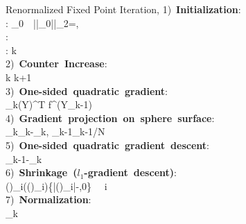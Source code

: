 \documentclass[12pt]{iopart}
\begin{document}
\begin{figure}
\begin{pseudocode}[ruled]{Renormalized Fixed Point Iteration}{\delta,\lambda}
1)\ \mbox{\bf Initialization}:\\
 \hspace{15pt}: \hspace{80pt}_{0}\ \ ||_{0}||_{2}=,\\
 \hspace{15pt}:\hspace{13pt}\delta\\
\hspace{15pt}: \hspace{62pt} k\\

2)\ \mbox{\bf Counter\ Increase}:\\
 \hspace{30pt}k \GETS k+1\\

3)\ \mbox{\bf One-sided quadratic gradient}:\\
\hspace{30pt}_{k}\GETS  (\textsc{Y}\Phi)^{\rm T} f^\prime (\textsc{Y}\Phi {}_{k-1})\\

4)\ \mbox{\bf Gradient projection on sphere surface}:\\
 \hspace{30pt}_{k}\GETS {}_{k}-\langle {}_{k},
 _{k-1}\rangle{}_{k-1}/N\\

5)\ \mbox{\bf One-sided quadratic gradient descent}:\\
 \hspace{30pt}\GETS {}_{k-1}-\delta{}_{k}\\

6)\ \mbox{\bf Shrinkage ($l_1$-gradient descent)}:\\ 
 \hspace{30pt}()_i\GETS{}(()_{i})\{|()_i|-\frac{\delta}{\lambda},0\} \ \ i \\

7)\ \mbox{\bf Normalization}:\\
\hspace{30pt}_{k}\GETS {} \\


\end{pseudocode}
\end{figure}
\end{document}
